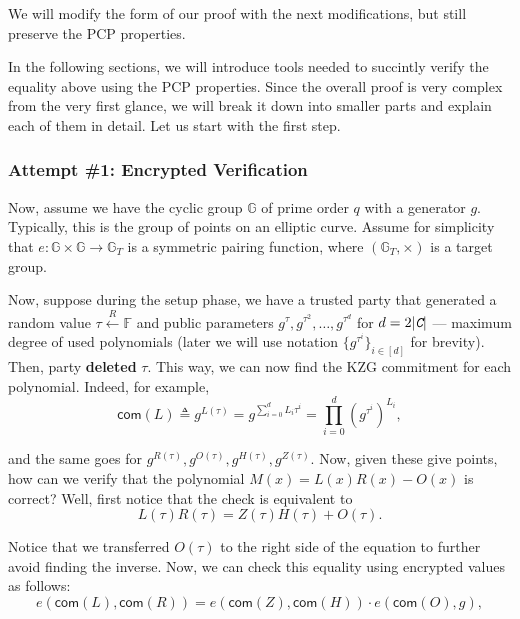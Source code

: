 \documentclass[../lecture-notes.tex]{subfiles}
\begin{document}
We will modify the form of our proof with the next modifications, but still preserve the PCP 
properties.

In the following sections, we will introduce tools needed to succintly verify the equality above
using the PCP properties. Since the overall proof is very complex from the very first glance, 
we will break it down into smaller parts and explain each of them in detail. Let us start 
with the first step.

\subsubsection{Attempt \#1: Encrypted Verification}

Now, assume we have the cyclic group $\mathbb{G}$ of prime order $q$ with a generator $g$. Typically, this is the group of points on an elliptic curve. Assume for simplicity that $e: \mathbb{G} \times \mathbb{G} \to \mathbb{G}_T$ is a symmetric pairing function, where $(\mathbb{G}_T, \times)$ is a target group.

Now, suppose during the setup phase, we have a trusted party that generated a random value $\tau \xleftarrow{R} \mathbb{F}$ and public parameters $g^{\tau},g^{\tau^2},\dots,g^{\tau^{d}}$ for $d=2|\textit{\texttt{C}}|$ --- maximum degree of used polynomials (later we will use notation $\{g^{\tau^i}\}_{i \in [d]}$ for brevity). Then, party \textbf{deleted} $\tau$. This way, we can now find the KZG commitment for each polynomial. Indeed, for example,
\begin{equation*}
    \mathsf{com}(L) \triangleq g^{L(\tau)} = g^{\sum_{i=0}^d L_i \tau^i} = \prod_{i=0}^d (g^{\tau^i})^{L_i},
\end{equation*}

and the same goes for $g^{R(\tau)}, g^{O(\tau)}, g^{H(\tau)}, g^{Z(\tau)}$. Now, given these give points, how can we verify that the polynomial $M(x) = L(x)R(x) - O(x)$ is correct? Well, first notice that the check is equivalent to
\begin{equation*}
    L(\tau)R(\tau) = Z(\tau)H(\tau) + O(\tau).
\end{equation*}

Notice that we transferred $O(\tau)$ to the right side of the equation to further avoid finding the inverse. Now, we can check this equality using encrypted values as follows:
\begin{equation*}
    e(\mathsf{com}(L), \mathsf{com}(R)) = e(\mathsf{com}(Z), \mathsf{com}(H)) \cdot e(\mathsf{com}(O), g),
\end{equation*}
\end{document}
